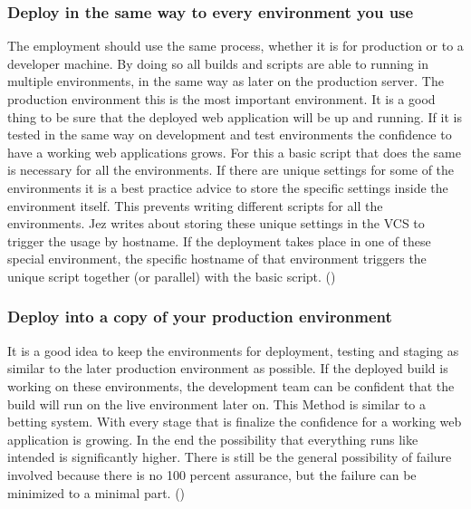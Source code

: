\subsubsection{Deploy in the same way to every environment you use}
The employment should use the same process, whether it is for production or to a developer machine. By doing so all builds and scripts are able to
running in multiple environments, in the same way as later on the production server. The production environment this is the most important environment.
It is a good thing to be sure that the deployed web application will be up and running. If it is tested in the same way on development and test environments
the confidence to have a working web applications grows. For this a basic script that does the same is necessary for all the environments. If there are
unique settings for some of the environments it is a best practice advice to store the specific settings inside the environment itself. This prevents
writing different scripts for all the environments. Jez writes about storing these unique settings in the VCS to trigger the usage by hostname.
If the deployment takes place in one of these special environment, the specific hostname of that environment triggers the unique script together (or parallel) with the basic script.
(\cite{humble2010continuous})

\subsubsection{Deploy into a copy of your production environment}
It is a good idea to keep the environments for deployment, testing and staging as similar to the later production environment as possible. If the deployed build
is working on these environments, the development team can be confident that the build will run on the live environment later on. This Method is similar to
a betting system. With every stage that is finalize the confidence for a working web application is growing. In the end the possibility that everything runs like
intended is significantly higher. There is still be the general possibility of failure involved because there is no 100 percent assurance, but the
failure can be minimized to a minimal part. (\cite{humble2010continuous})

